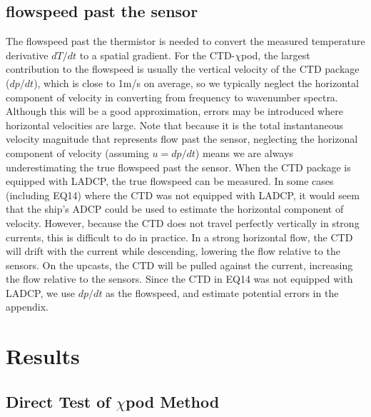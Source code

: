 \documentclass{ametsoc}
\begin{document}
\subsection{flowspeed past the sensor}

The flowspeed past the thermistor is needed to convert the measured temperature derivative $dT/dt$ to a spatial gradient. For the CTD-$\chi$pod, the largest contribution to the flowspeed is usually the vertical velocity of the CTD package ($dp/dt$), which is close to 1m/s on average, so we typically neglect the horizontal component of velocity in converting from frequency to wavenumber spectra. Although this will be a good approximation, errors may be introduced where horizontal velocities are large. Note that because it is the total instantaneous velocity magnitude that represents flow past the sensor, neglecting the horizonal component of velocity (assuming $u=dp/dt$) means we are always underestimating the true flowspeed past the sensor. When the CTD package is equipped with LADCP, the true flowspeed can be measured. In some cases (including EQ14) where the CTD was not equipped with LADCP, it would seem that the ship's ADCP could be used to estimate the horizontal component of velocity. However, because the CTD does not travel perfectly vertically in strong currents, this is difficult to do in practice. In a strong horizontal flow, the CTD will drift with the current while descending, lowering the flow relative to the sensors. On the upcasts, the CTD will be pulled against the current, increasing the flow relative to the sensors. Since the CTD in EQ14 was not equipped with LADCP, we use $dp/dt$ as the flowspeed, and estimate potential errors in the appendix.

%


\section{Results }


\subsection{Direct Test of $\chi$pod Method}
\end{document}
